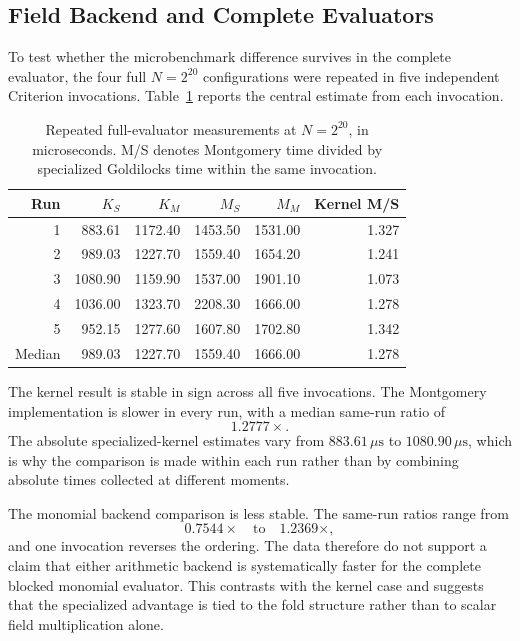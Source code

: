 \subsection{Field Backend and Complete Evaluators}
\label{sec:backend-results}

To test whether the microbenchmark difference survives in the complete
evaluator, the four full \(N=2^{20}\) configurations were repeated in
five independent Criterion invocations.  Table~\ref{tab:backend-stability}
reports the central estimate from each invocation.

\begin{table}[ht]
\centering
\caption{Repeated full-evaluator measurements at \(N=2^{20}\), in
microseconds.  M/S denotes Montgomery time divided by specialized
Goldilocks time within the same invocation.}
\label{tab:backend-stability}
\begin{tabular}{rrrrrr}
\toprule
Run & \(K_S\) & \(K_M\) & \(M_S\) & \(M_M\) & Kernel M/S\\
\midrule
1 & 883.61 & 1172.40 & 1453.50 & 1531.00 & 1.327\\
2 & 989.03 & 1227.70 & 1559.40 & 1654.20 & 1.241\\
3 & 1080.90 & 1159.90 & 1537.00 & 1901.10 & 1.073\\
4 & 1036.00 & 1323.70 & 2208.30 & 1666.00 & 1.278\\
5 & 952.15 & 1277.60 & 1607.80 & 1702.80 & 1.342\\
\midrule
Median &
989.03 &
1227.70 &
1559.40 &
1666.00 &
1.278\\
\bottomrule
\end{tabular}
\end{table}

The kernel result is stable in sign across all five invocations.  The
Montgomery implementation is slower in every run, with a median same-run
ratio of
\[
1.2777\times.
\]
The absolute specialized-kernel estimates vary from
\(883.61\,\mu\mathrm{s}\) to
\(1080.90\,\mu\mathrm{s}\), which is why the comparison is made
within each run rather than by combining absolute times collected at
different moments.

The monomial backend comparison is less stable.  The same-run ratios range
from
\[
0.7544\times
\quad\text{to}\quad
1.2369\times,
\]
and one invocation reverses the ordering.  The data therefore do not
support a claim that either arithmetic backend is systematically faster for
the complete blocked monomial evaluator.  This contrasts with the kernel
case and suggests that the specialized advantage is tied to the fold
structure rather than to scalar field multiplication alone.


